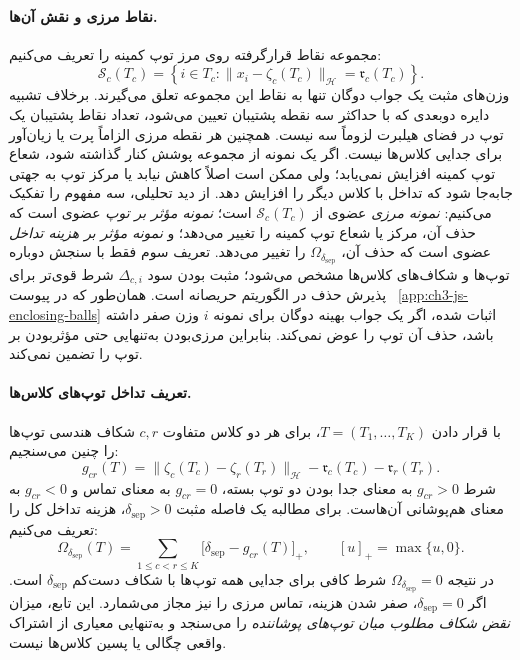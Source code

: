 \paragraph{نقاط مرزی و نقش آن‌ها.}
مجموعه نقاط قرارگرفته روی مرز
توپ کمینه را تعریف می‌کنیم:
\begin{equation}\label{eq:ch3-outlier-js-meb-boundary}
\mathcal S_c(T_c)=
\left\{i\in T_c:
\|x_i-\zeta_c(T_c)\|_{\mathcal H}
=\mathfrak r_c(T_c)\right\}.
\end{equation}
وزن‌های مثبت یک جواب دوگان
تنها به نقاط این مجموعه تعلق می‌گیرند.
برخلاف تشبیه دایره دوبعدی که
با حداکثر سه نقطه پشتیبان
تعیین می‌شود، تعداد نقاط
پشتیبان یک توپ در فضای هیلبرت
لزوماً سه نیست. همچنین هر نقطه
مرزی الزاماً پرت یا زیان‌آور
برای جدایی کلاس‌ها نیست.
اگر یک نمونه از مجموعه پوشش
کنار گذاشته شود، شعاع توپ کمینه
افزایش نمی‌یابد؛ ولی ممکن است
اصلاً کاهش نیابد یا مرکز توپ
به جهتی جابه‌جا شود که تداخل
با کلاس دیگر را افزایش دهد.
از دید تحلیلی، سه مفهوم
را تفکیک می‌کنیم:
\emph{نمونه مرزی} عضوی از
$\mathcal S_c(T_c)$ است؛
\emph{نمونه مؤثر بر توپ}
عضوی است که حذف آن، مرکز یا
شعاع توپ کمینه را تغییر می‌دهد؛
و \emph{نمونه مؤثر بر هزینه
تداخل} عضوی است که حذف آن،
$\Omega_{\delta_{\mathrm{sep}}}$
را تغییر می‌دهد. تعریف سوم
فقط با سنجش دوباره توپ‌ها
و شکاف‌های کلاس‌ها مشخص
می‌شود؛ مثبت بودن سود
$\Delta_{c,i}$ شرط قوی‌تر
برای پذیرش حذف در الگوریتم
حریصانه است.
همان‌طور که در پیوست~
\ref{app:ch3-js-enclosing-balls}
اثبات شده، اگر یک جواب
بهینه دوگان برای نمونه
$i$ وزن صفر داشته باشد،
حذف آن توپ را عوض نمی‌کند.
بنابراین مرزی‌بودن به‌تنهایی
حتی مؤثربودن بر توپ را
تضمین نمی‌کند.

\paragraph{تعریف تداخل توپ‌های کلاس‌ها.}
با قرار دادن
$T=(T_1,\ldots,T_K)$،
برای هر دو کلاس متفاوت $c,r$
شکاف هندسی توپ‌ها را چنین می‌سنجیم:
\begin{equation}\label{eq:ch3-outlier-js-ball-gap}
g_{cr}(T)=
\|\zeta_c(T_c)-\zeta_r(T_r)\|_{\mathcal H}
-\mathfrak r_c(T_c)-\mathfrak r_r(T_r).
\end{equation}
شرط $g_{cr}>0$ به معنای
جدا بودن دو توپ بسته،
$g_{cr}=0$ به معنای تماس
و $g_{cr}<0$ به معنای
هم‌پوشانی آن‌هاست.
برای مطالبه یک فاصله مثبت
$\delta_{\mathrm{sep}}>0$،
هزینه تداخل کل را تعریف می‌کنیم:
\begin{equation}\label{eq:ch3-outlier-js-total-overlap}
\boxed{
\Omega_{\delta_{\mathrm{sep}}}(T)=
\sum_{1\le c<r\le K}
\bigl[\delta_{\mathrm{sep}}-g_{cr}(T)\bigr]_+,
\qquad [u]_+=\max\{u,0\}.
}
\end{equation}
در نتیجه $\Omega_{\delta_{\mathrm{sep}}}=0$
شرط کافی برای جدایی همه توپ‌ها
با شکاف دست‌کم
$\delta_{\mathrm{sep}}$ است.
اگر $\delta_{\mathrm{sep}}=0$،
صفر شدن هزینه، تماس مرزی را
نیز مجاز می‌شمارد.
این تابع، میزان \emph{نقض
شکاف مطلوب میان توپ‌های
پوشاننده} را می‌سنجد و
به‌تنهایی معیاری از اشتراک
واقعی چگالی یا پسین کلاس‌ها
نیست.

